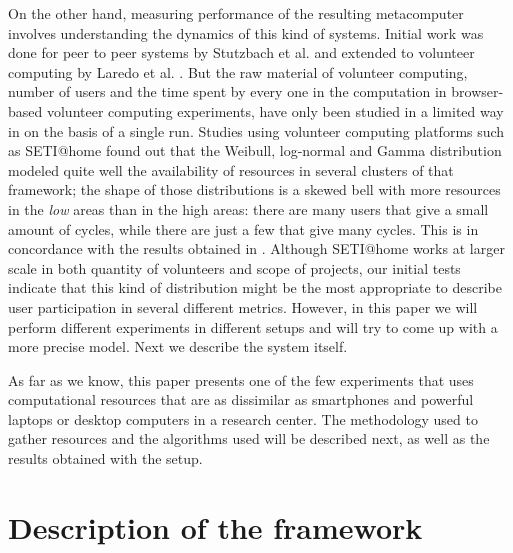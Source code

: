 \documentclass[journal,onecolumn]{IEEEtran}
\begin{document}
On the other hand, measuring performance of the resulting metacomputer
involves understanding the dynamics of this kind of systems. Initial
work was done for peer to peer systems by Stutzbach et
al. \cite{stutzbach2006understanding} and extended to volunteer
computing by Laredo et al. \cite{churn08,laredo2008rcp}. But the raw material of
volunteer computing, number of users and the time spent by every one in the
computation in browser-based volunteer computing experiments, have
only been studied in a limited way in 
\cite{DBLP:journals/gpem/LaredoBGVAGF14} on the basis of a single
run. Studies using volunteer computing platforms such as SETI@home
\cite{javadi2009mining} found out that the Weibull, log-normal and
Gamma distribution 
modeled quite well the availability of resources in several clusters
of that framework; the shape of those distributions is a skewed bell
with more resources in the {\em low} areas than in the high areas:
there are many users that give a small amount of cycles, while there
are just a few that give many cycles. This is in concordance with the
results obtained in \cite{agajaj}. Although SETI@home works
at larger scale in both quantity of volunteers and scope of projects, 
our initial tests indicate that
this kind of distribution might be the most appropriate to describe
user participation in several different metrics. However, in this
paper we will perform different experiments in different setups and
will try to come up with a more precise model. Next we describe the
system itself.


As far as we know, this paper presents one of the few experiments that
uses computational resources that are as dissimilar as smartphones and
powerful laptops 
or desktop computers in a research center. The methodology used to
gather resources and the algorithms used will be described next, as
well as the results obtained with the setup.

\section{Description of the framework}
\label{sec:description}
\end{document}
